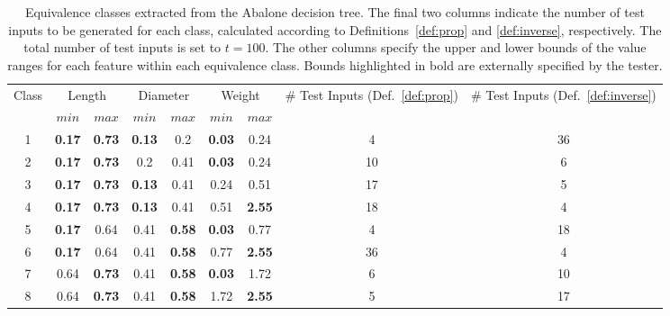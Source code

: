 \documentclass[
]{ceurart}
\theoremstyle{definition}
\begin{document}
\begin{table}
\caption{Equivalence classes extracted from the Abalone decision tree. The final two columns indicate the number of test inputs to be generated for each class, calculated according to Definitions~\ref{def:prop} and \ref{def:inverse}, respectively. The total number of test inputs is set to $t = 100$. The other columns specify the upper and lower bounds of the value ranges for each feature within each equivalence class. Bounds highlighted in bold are externally specified by the tester.}
\label{tab:eqclass}
\begin{tabular}{ccccccccc}\toprule
 \multirow{2}{*}{Class} & \multicolumn{2}{c}{Length} & \multicolumn{2}{c}{Diameter}  & \multicolumn{2}{c}{Weight}& \multirow{2}{*}{\# Test Inputs (Def.~\ref{def:prop})}& \multirow{2}{*}{\# Test Inputs (Def.~\ref{def:inverse})}
\\\cmidrule(lr){2-3}\cmidrule(lr){4-5}\cmidrule(lr){6-7}
      & $min$  & $max$ & $min$    & $max$  & $min$ & $max$\\\midrule
1    & \textbf{0.17} & \textbf{0.73} & \textbf{0.13} & 0.2              & \textbf{0.03} & 0.24 & 4 & 36\\
2 & \textbf{0.17} & \textbf{0.73} & 0.2                   & 0.41            & \textbf{0.03} & 0.24 & 10& 6\\
3 & \textbf{0.17} & \textbf{0.73} & \textbf{0.13} & 0.41               & 0.24 & 0.51              & 17& 5\\
4 & \textbf{0.17} & \textbf{0.73} & \textbf{0.13} & 0.41                & 0.51 & \textbf{2.55} & 18& 4\\
5 & \textbf{0.17} & 0.64              & 0.41                 & \textbf{0.58} & \textbf{0.03} & 0.77 & 4 & 18\\
6 & \textbf{0.17} & 0.64              & 0.41                & \textbf{0.58} & 0.77 & \textbf{2.55} & 36 & 4\\
7 & 0.64 & \textbf{0.73}              & 0.41                 & \textbf{0.58} & \textbf{0.03} & 1.72 & 6 & 10\\
8   & 0.64 & \textbf{0.73}            & 0.41                 & \textbf{0.58} & 1.72 & \textbf{2.55} & 5& 17 \\\bottomrule
\end{tabular}
\end{table}
\end{document}
